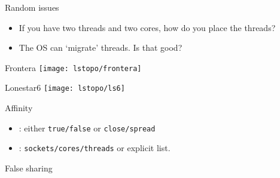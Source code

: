 
\begin{numberedframe}{Random issues}
  \begin{itemize}
  \item If you have two threads and two cores, how do you place the threads?
  \item The OS can `migrate' threads. Is that good?
  \end{itemize}
\end{numberedframe}

\begin{numberedframe}{Frontera}
\texttt{[image: lstopo/frontera]}
\end{numberedframe}

\begin{numberedframe}{Lonestar6}
\texttt{[image: lstopo/ls6]}
\end{numberedframe}

\begin{numberedframe}{Affinity}
  \begin{itemize}
  \item
    : either \lstinline{true/false} or \lstinline{close/spread}
  \item 
    : \lstinline{sockets/cores/threads} or explicit list.
  \end{itemize}
\end{numberedframe}



\begin{numberedframe}{False sharing}
  
\end{numberedframe}

\endinput

\begin{numberedframe}{}
  \begin{itemize}
  \item 
  \end{itemize}
\end{numberedframe}

